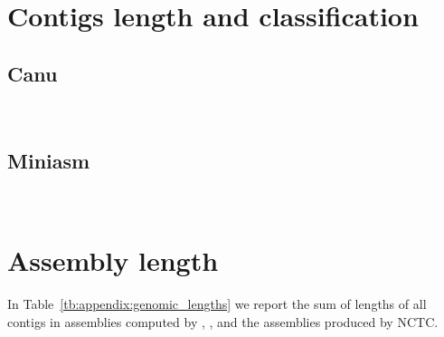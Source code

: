 \documentclass[./main.tex]{subfiles}
\begin{document}
\newpage

\twocolumn
\section{Contigs length and classification}
\subsection*{Canu}

\newpage
~

\newpage


\subsection*{Miniasm}

\onecolumn
\newpage

~

\section{Assembly length}

In Table~\ref{tb:appendix:genomic_lengths} we report the sum of lengths of all contigs in assemblies computed by \miniasm, \canu, and the assemblies produced by NCTC.
\end{document}
